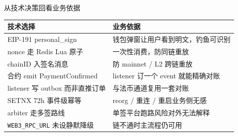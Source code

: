 \documentclass[aspectratio=169,11pt]{beamer}
\begin{document}
\begin{frame}[shrink]{从技术决策回看业务依据}
\small
\begin{tabular}{@{}ll@{}}
\toprule
技术选择                        & 业务依据 \\
\midrule
EIP-191 personal\_sign          & 钱包弹窗让用户看到明文，钓鱼可识别 \\
nonce 走 Redis Lua 原子         & 一次性消费，防同链重放 \\
chainID 入签名消息              & 防 mainnet / L2 跨链重放 \\
合约 emit PaymentConfirmed       & listener 订一个 event 就能精确对账 \\
listener 写 outbox 而非直推订单 & 与法币通道复用一套对账 \\
SETNX 72h 事件级幂等            & reorg / 重连 / 重启业务侧无感 \\
arbiter 走多签路线              & 单签平台跑路风险对外无法解释 \\
\texttt{WEB3\_RPC\_URL} 未设静默降级 & 链不通时主流程仍可用 \\
\bottomrule
\end{tabular}
\vspace{1mm}
\end{frame}

\appendix
\end{document}
